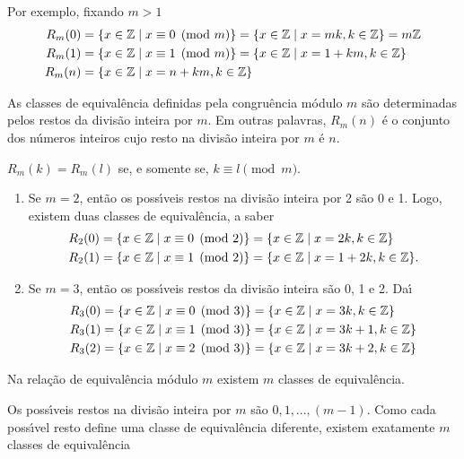 Por exemplo, fixando $m > 1$
\begin{align*}
	R_{m}(0) &= \{x \in \mathbb{Z} \mid x\equiv 0 \pmod{m}\}=\{x\in \mathbb{Z} \mid x = mk, k\in\mathbb{Z}\}=m\mathbb{Z}\\
	R_{m}(1) &= \{x\in\mathbb{Z} \mid x\equiv 1 \pmod{m}\}=\{x\in\mathbb{Z} \mid x = 1 + km, k\in\mathbb{Z}\}\\
	R_{m}(n) &= \{x\in\mathbb{Z} \mid x = n + km, k\in\mathbb{Z}\}
\end{align*}

\begin{proposicao}
	As classes de equival{\^e}ncia definidas pela congru{\^e}ncia m{\'o}dulo $m$ s{\~a}o determinadas pelos restos da divis{\~a}o inteira por $m$. Em outras palavras, $R_{m}(n)$ {\'e} o conjunto dos n{\'u}meros inteiros cujo resto na divis{\~a}o inteira por $m$ {\'e} $n$.
\end{proposicao}

\begin{corolario}
	$R_{m}(k) = R_{m}(l)$ se, e somente se, $k\equiv l \pmod{m}$.
\end{corolario}

\begin{exemplos}
	\begin{enumerate}
		\item Se $m=2$, ent{\~a}o os poss{\'\i}veis restos na divis{\~a}o inteira por 2 s{\~a}o 0 e 1. Logo, existem duas classes de equival{\^e}ncia, a saber
		\begin{align*}
			R_{2}(0) &= \{x \in \mathbb{Z} \mid x\equiv 0 \pmod{2}\} = \{x\in \mathbb{Z} \mid x = 2k, k\in\mathbb{Z}\}\\
			R_{2}(1) &= \{x\in\mathbb{Z} \mid x\equiv 1 \pmod{2}\} = \{x\in\mathbb{Z} \mid x = 1 + 2k, k\in\mathbb{Z}\}.
		\end{align*}
		
		\item Se $m = 3$, ent{\~a}o os poss{\'\i}veis restos da divis{\~a}o inteira s{\~a}o 0, 1 e 2. Da{\'\i}
		\begin{align*}
			R_{3}(0) &= \{x \in \mathbb{Z} \mid x\equiv 0 \pmod{3}\} = \{x\in \mathbb{Z} \mid x = 3k, k \in \mathbb{Z}\}\\
			R_{3}(1) & = \{x \in \mathbb{Z} \mid x\equiv 1 \pmod{3}\} = \{x\in\mathbb{Z} \mid x = 3k + 1, k \in \mathbb{Z}\}\\
			R_{3}(2) &= \{x \in \mathbb{Z} \mid x\equiv 2 \pmod{3}\} = \{x\in\mathbb{Z} \mid x = 3k + 2, k \in \mathbb{Z}\}
		\end{align*}
	\end{enumerate}	
\end{exemplos}

\begin{proposicao}
	Na rela{\c c}{\~a}o de equival{\^e}ncia m{\'o}dulo $m$ existem $m$ classes de equival{\^e}ncia.
\end{proposicao}
\begin{prova}
	Os poss{\'\i}veis restos na divis{\~a}o inteira por $m$ s{\~a}o $0,1,...,(m-1)$. Como cada poss{\'\i}vel resto define uma classe de equival{\^e}ncia diferente, existem exatamente $m$ classes de equival{\^e}ncia
\end{prova}

